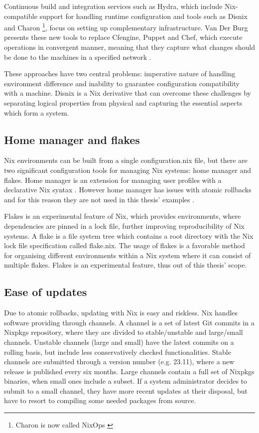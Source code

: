 Continuous build and integration services such as Hydra,
which include Nix-compatible support for handling runtime
configuration and tools such as Disnix and Charon \footnote{Charon is
now called NixOps \cite{githubNixNixpkgsNixOS}}, focus on
setting up complementary infrastructure. Van Der Burg presents these
new tools to replace Cfengine, Puppet and Chef, which execute
operations in convergent manner, meaning that they capture what
changes should be done to the machines in a specified
network \cite{van2013reference}.

These approaches have two central problems: imperative nature of
handling environment difference and inability to guarantee
configuration compatibility with a machine. Disnix is a Nix derivative
that can overcome these challenges by separating logical properties
from physical and capturing the essential aspects which form a
system. \cite{van2013reference}

\subsection{Home manager and flakes}

Nix environments can be built from a single configuration.nix file,
but there are two significant configuration tools for managing Nix
systems: home manager and flakes. Home manager is an extension for
managing user profiles with a declarative Nix syntax
\cite{nixcommunityHomeManager}. However home manager has issues with atomic
rollbacks and for this reason they are not used in this thesis'
examples \cite{nixcommunityHomeManager}.

Flakes is an experimental feature of Nix, which provides environments, where
dependencies are pinned in a lock file, further improving
reproducibility of Nix systems. A flake is a
file system tree which contains a root directory with the Nix lock file
specification called flake.nix. The usage of flakes is a favorable method
for organising different environments within a Nix system where it
can consist of multiple flakes. Flakes is an experimental
feature, thus out of this thesis' scope. \cite{nixosFlakesNixOS}

\subsection{Ease of updates}

Due to atomic rollbacks, updating with Nix is easy and riskless. Nix handles software providing through  channels. A channel is a set of latest Git commits in a Nixpkgs
repository, where they are divided to stable/unstable and
large/small channels. Unstable channels (large and small) have the
latest commits on a rolling basis, but include less conservatively
checked functionalities. Stable channels are submitted through a
version number (e.g. 23.11), where a new release is published every
six months. Large channels contain a full set of
Nixpkgs binaries, when small ones include a subset. If a system
administrator decides to submit to a small channel, they have more
recent updates at their disposal, but have to resort to compiling some
needed packages from source. \cite{nixosChannelsNixOS}

